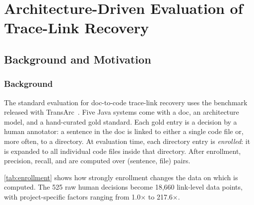 \section{Architecture-Driven Evaluation of Trace-Link Recovery}
\label{sec:metric}

\subsection{Background and Motivation}
\label{sec:metric:bias}

\subsubsection*{Background}
The standard evaluation for doc-to-code trace-link recovery uses the benchmark released with TransArc~\cite{transarc,replication}.
Five Java systems come with a doc, an architecture model, and a hand-curated gold standard.
Each gold entry is a decision by a human annotator: a sentence in the doc is linked to either a single code file or, more often, to a directory.
At evaluation time, each directory entry is \emph{enrolled}: it is expanded to all individual code files inside that directory.
After enrollment, precision, recall, and \fone are computed over (sentence, file) pairs.

\autoref{tab:enrollment} shows how strongly enrollment changes the data on which \fone is computed.
The 525 raw human decisions become 18,660 link-level data points, with project-specific factors ranging from 1.0$\times$ to 217.6$\times$.



